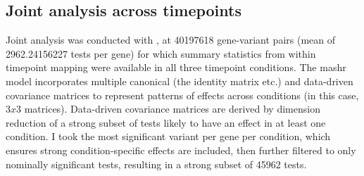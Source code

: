 \subsection{Joint  analysis across timepoints}

Joint analysis was conducted with \autocite{urbut2018FlexibleStatisticalMethods}, at 40197618 gene-variant pairs (mean of \num[round-mode=places,round-precision=0]{2962.24156227} tests per gene) for which summary statistics from within timepoint mapping were available in all three timepoint conditions.
The mashr model incorporates multiple canonical (the identity matrix etc.) and data-driven covariance matrices to represent patterns of effects across conditions (in this case, $3 x 3$ matrices).
Data-driven covariance matrices are derived by dimension reduction of a strong subset of tests likely to have an effect in at least one condition.
I took the most significant variant per gene per condition, 
which ensures strong condition-specific effects are included,
then further filtered to only nominally significant tests, resulting in a strong subset of 45962 tests.


